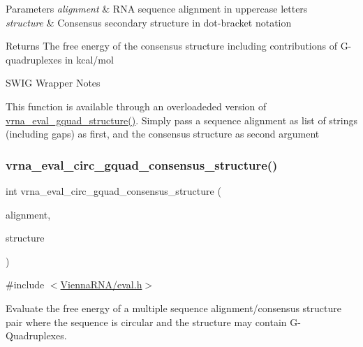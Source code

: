 \begin{DoxyParams}{Parameters}
{\em alignment} & R\+NA sequence alignment in uppercase letters \\
\hline
{\em structure} & Consensus secondary structure in dot-\/bracket notation \\
\hline
\end{DoxyParams}
\begin{DoxyReturn}{Returns}
The free energy of the consensus structure including contributions of G-\/quadruplexes in kcal/mol
\end{DoxyReturn}
\begin{DoxyRefDesc}{S\+W\+I\+G Wrapper Notes}
\item[\mbox{\hyperlink{wrappers__wrappers000041}{S\+W\+I\+G Wrapper Notes}}]This function is available through an overloadeded version of \mbox{\hyperlink{group__eval_ga3263504825ef4b523eba797c99921df4}{vrna\+\_\+eval\+\_\+gquad\+\_\+structure()}}. Simply pass a sequence alignment as list of strings (including gaps) as first, and the consensus structure as second argument \end{DoxyRefDesc}
\mbox{\label{group__eval_gac673ebb9ae2a29f54d201e2ac5b85540}} 
\subsubsection{\texorpdfstring{vrna\+\_\+eval\+\_\+circ\+\_\+gquad\+\_\+consensus\+\_\+structure()}{vrna\_eval\_circ\_gquad\_consensus\_structure()}}
{\footnotesize\ttfamily int vrna\+\_\+eval\+\_\+circ\+\_\+gquad\+\_\+consensus\+\_\+structure (\begin{DoxyParamCaption}\item[{const char $\ast$$\ast$}]{alignment,  }\item[{const char $\ast$}]{structure }\end{DoxyParamCaption})}



{\ttfamily \#include $<$\mbox{\hyperlink{eval_8h}{Vienna\+R\+N\+A/eval.\+h}}$>$}



Evaluate the free energy of a multiple sequence alignment/consensus structure pair where the sequence is circular and the structure may contain G-\/\+Quadruplexes. 

